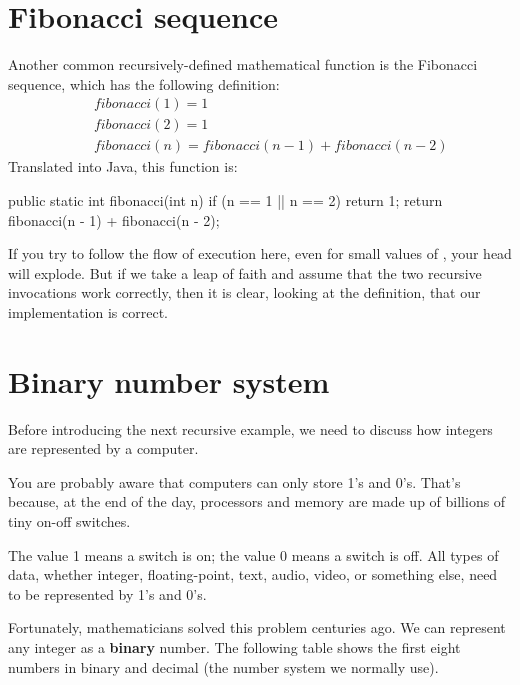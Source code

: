 \section{Fibonacci sequence}
\label{fibonacci}


Another common recursively-defined mathematical function is the Fibonacci sequence, which has the following definition:
%
\begin{eqnarray*}
&& fibonacci(1) = 1 \\
&& fibonacci(2) = 1 \\
&& fibonacci(n) = fibonacci(n-1) + fibonacci(n-2)
\end{eqnarray*}
%
Translated into Java, this function is:

\begin{code}
public static int fibonacci(int n) {
    if (n == 1 || n == 2) {
        return 1;
    }
    return fibonacci(n - 1) + fibonacci(n - 2);
}
\end{code}

If you try to follow the flow of execution here, even for small values of , your head will explode.
But if we take a leap of faith and assume that the two recursive invocations work correctly, then it is clear, looking at the definition, that our implementation is correct.


\section{Binary number system}

Before introducing the next recursive example, we need to discuss how integers are represented by a computer.

You are probably aware that computers can only store 1's and 0's.
That's because, at the end of the day, processors and memory are made up of billions of tiny on-off switches.

The value 1 means a switch is on; the value 0 means a switch is off.
All types of data, whether integer, floating-point, text, audio, video, or something else, need to be represented by 1's and 0's.


Fortunately, mathematicians solved this problem centuries ago.
We can represent any integer as a {\bf binary} number.
The following table shows the first eight numbers in binary and decimal (the number system we normally use).

